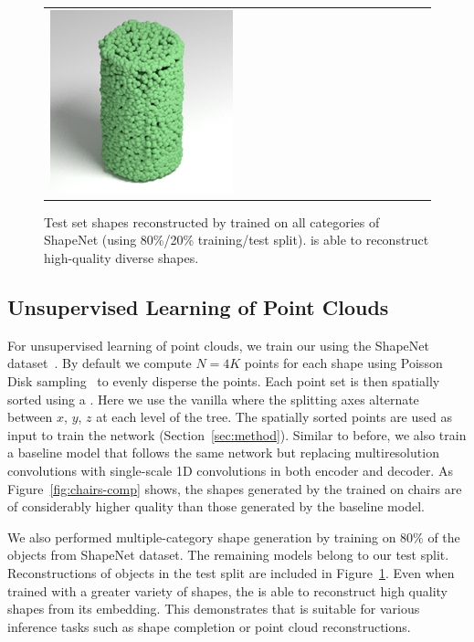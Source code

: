 \begin{figure}[t]
\begin{tabular}{cccccccccccccccc}
\includegraphics[width=.1\linewidth]{rendering/selected/rec_shapenet/pc_0054.png}
\end{tabular}
\vspace{-12pt}
    \caption{\label{fig:gallery} 
    \small Test set shapes reconstructed by \mrvae trained on all categories of ShapeNet (using 80\%/20\% training/test split). \mrvae is able to reconstruct high-quality diverse shapes.}
    \vspace{-8pt}
\end{figure}

\subsection{Unsupervised Learning of Point Clouds} \label{sec:exp_gen}
For unsupervised learning of point clouds, we train our \mrvae using the ShapeNet dataset~\cite{chang2015shapenet}. 
By default we compute $N=4K$ points for each shape using Poisson Disk sampling~\cite{Bowers:2010:PPD} to evenly disperse the points. 
Each point set is then spatially sorted using a \kdtree. 
Here we use the vanilla \kdtree where the splitting axes alternate between $x$, $y$, $z$ at each level of the tree. 
The spatially sorted points are used as input to train the \mrvae network (Section~\ref{sec:method}). 
Similar to before, we also train a baseline model that follows the same network but replacing multiresolution convolutions with single-scale 1D convolutions
in both encoder and decoder. 
As Figure~\ref{fig:chairs-comp} shows, the shapes generated by the \mrvae trained on chairs are of considerably higher quality than those generated by the baseline model. 

We also performed multiple-category shape generation by training \mrvae on $80\%$ of the objects from ShapeNet dataset. 
The remaining models belong to our test split. 
Reconstructions of objects in the test split are included in Figure~\ref{fig:gallery}. 
Even when trained with a greater variety of shapes, the \mrvae is able to reconstruct high quality shapes from its embedding. 
This demonstrates that \mrvae is suitable for various inference tasks such as shape completion or point cloud reconstructions.

